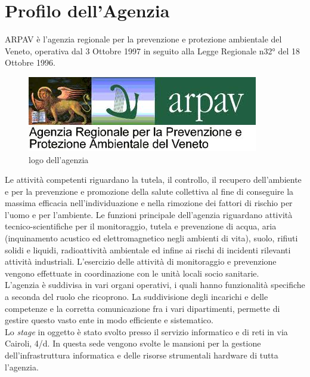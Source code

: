 \chapter{Profilo dell'Agenzia}
\label{1.0}
\thispagestyle{fancy} 

ARPAV è l'agenzia regionale per la prevenzione e protezione ambientale del Veneto, operativa dal 3 Ottobre 1997 in seguito alla Legge Regionale n32° del 18 Ottobre 1996.

\begin{figure}[htbp]
	\centering
	\includegraphics[scale=0.7]{./capitoli/capitolo1/img/logoARPAV.jpg}
	\caption{logo dell'agenzia}
\end{figure}

Le attività competenti riguardano la tutela, il controllo, il recupero dell'ambiente e per la prevenzione e promozione della salute collettiva al fine di conseguire la massima efficacia nell'individuazione e nella rimozione dei fattori di rischio per l'uomo e per l'ambiente. Le funzioni principale dell'agenzia riguardano attività tecnico-scientifiche per il monitoraggio, tutela e prevenzione di acqua, aria (inquinamento acustico ed elettromagnetico negli ambienti di vita), suolo, rifiuti solidi e liquidi, radioattività ambientale ed infine ai rischi di incidenti rilevanti attività industriali. L'esercizio delle attività di monitoraggio e prevenzione vengono effettuate in coordinazione con le unità locali socio sanitarie.\\
L'agenzia è suddivisa in vari organi operativi, i quali hanno funzionalità specifiche a seconda del ruolo che ricoprono. La suddivisione degli incarichi e delle competenze e la corretta comunicazione fra i vari dipartimenti, permette di gestire questo vasto ente in modo efficiente e sistematico.\\
Lo \textit{stage} in oggetto è stato svolto presso il servizio informatico e di reti in via Cairoli, 4/d. In questa sede vengono svolte le mansioni per la gestione dell'infrastruttura informatica e delle risorse strumentali hardware di tutta l'agenzia.

